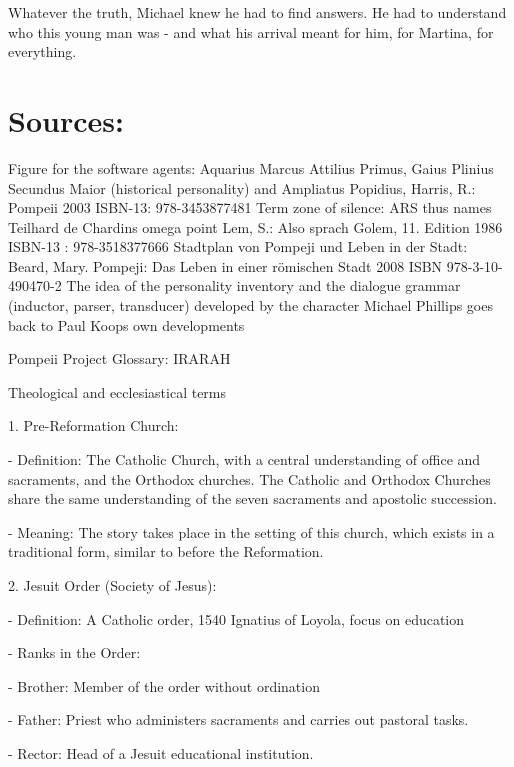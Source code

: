 \documentclass[
]{article}
\begin{document}
Whatever the truth, Michael knew he had to find answers. He had to
understand who this young man was - and what his arrival meant for him,
for Martina, for everything.

\section{\texorpdfstring{Sources: }{Sources: }}\label{sources}

Figure for the software agents: Aquarius Marcus Attilius Primus, Gaius
Plinius Secundus Maior (historical personality) and Ampliatus Popidius,
Harris, R.: Pompeii 2003 ISBN-13: 978-3453877481 Term zone of silence:
ARS thus names Teilhard de Chardin\textquotesingle s omega point Lem,
S.: Also sprach Golem, 11. Edition 1986 ISBN-13 : 978-3518377666
Stadtplan von Pompeji und Leben in der Stadt: Beard, Mary. Pompeji: Das
Leben in einer römischen Stadt 2008 ISBN 978-3-10-490470-2 The idea of
\hspace{0pt}\hspace{0pt}the personality inventory and the dialogue
grammar (inductor, parser, transducer) developed by the character
Michael Phillips goes back to Paul Koop\textquotesingle s own
developments

Pompeii Project Glossary: \hspace{0pt}\hspace{0pt}IRARAH

Theological and ecclesiastical terms

1. Pre-Reformation Church:

- Definition: The Catholic Church, with a central understanding of
office and sacraments, and the Orthodox churches. The Catholic and
Orthodox Churches share the same understanding of the seven sacraments
and apostolic succession.

- Meaning: The story takes place in the setting of this church, which
exists in a traditional form, similar to before the Reformation.

2. Jesuit Order (Society of Jesus):

- Definition: A Catholic order, 1540 Ignatius of Loyola, focus on
education

- Ranks in the Order:

- Brother: Member of the order without ordination

- Father: Priest who administers sacraments and carries out pastoral
tasks.

- Rector: Head of a Jesuit educational institution.
\end{document}
